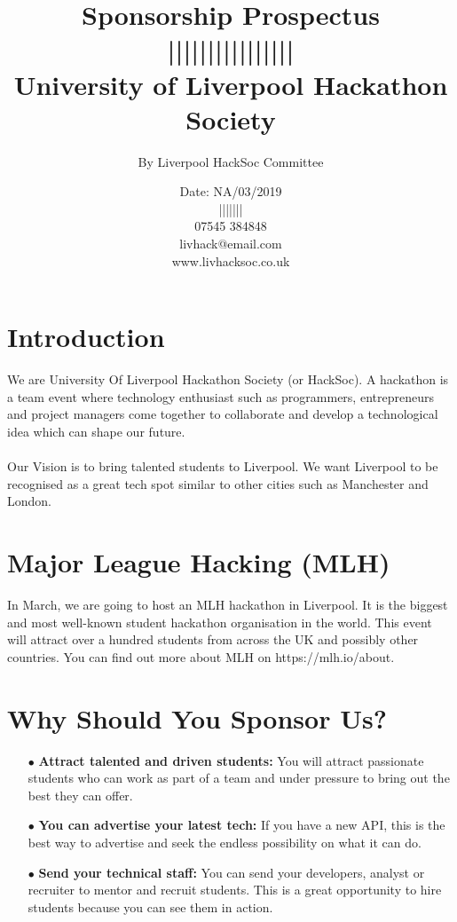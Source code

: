 \documentclass{report}
\title{%
       \Huge \textcolor{MyGold}{Sponsorship Prospectus}
       \\
       \large ||||||||||||||||
       \\
       \large {University of Liverpool Hackathon Society}}
\author{By Liverpool HackSoc Committee}
\date{Date: NA/03/2019 \\
        \large ||||||| \\
        \large 07545 384848 \\
        \large \textcolor{MyLinkBlue}{livhack@email.com} \\
        \large \textcolor{MyLinkBlue}{www.livhacksoc.co.uk}
    }
\begin{document}
    \pagecolor{MyMidBlack}
    \color{white}
    \maketitle

    
    \section *{Introduction}
    We are University Of Liverpool Hackathon Society (or HackSoc). A hackathon is a team event where technology enthusiast such as programmers, entrepreneurs and project managers come together to collaborate and develop a technological idea which can shape our future. 
    \\
    \\
    Our Vision is to bring talented students to Liverpool. We want Liverpool to be recognised as a great tech spot similar to other cities such as Manchester and London. 

    \section *{Major League Hacking (MLH)}
    In March, we are going to host an MLH hackathon in Liverpool. It is the biggest and most well-known student hackathon organisation in the world. This event will attract over a hundred students from across the UK and possibly other countries. You can find out more about MLH on \textcolor{MyLinkBlue}{https://mlh.io/about}.
    
    
    \section *{Why Should You Sponsor Us?}
    
    \begin{itemize}
        \item[$\bullet$] \textbf{Attract talented and driven students: }You will attract passionate students who can work as part of a team and under pressure to bring out the best they can offer.
        \item[$\bullet$] \textbf{You can advertise your latest tech: }
        If you have a new API, this is the best way to advertise and seek the endless possibility on what it can do.
        \item[$\bullet$] \textbf{Send your technical staff: }
        You can send your developers, analyst or recruiter to mentor and recruit students. This is a great opportunity to hire students because you can see them in action. 
    \end{itemize}
     
\end{document}
